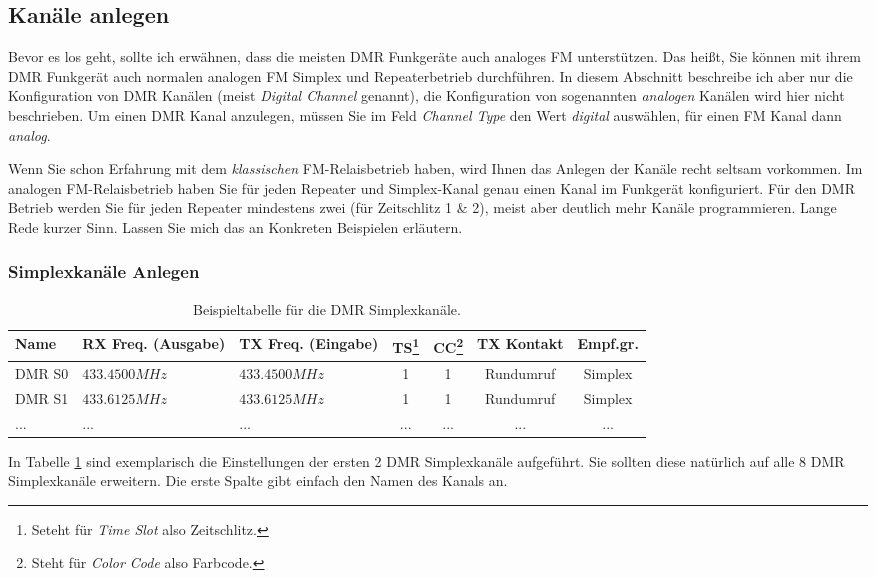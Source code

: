 \subsection{Kanäle anlegen} \label{sec:cp:channel}
Bevor es los geht, sollte ich erwähnen, dass die meisten DMR Funkgeräte auch analoges FM unterstützen. Das heißt, Sie können mit ihrem DMR Funkgerät auch normalen analogen FM Simplex und Repeaterbetrieb durchführen. In diesem Abschnitt beschreibe ich aber nur die Konfiguration von DMR Kanälen (meist \emph{Digital Channel} genannt), die Konfiguration von sogenannten \emph{analogen} Kanälen wird hier nicht beschrieben. Um einen DMR Kanal anzulegen, müssen Sie im Feld \emph{Channel Type} den Wert \emph{digital} auswählen, für einen FM Kanal dann \emph{analog}.

Wenn Sie schon Erfahrung mit dem \emph{klassischen} FM-Relaisbetrieb haben, wird Ihnen das Anlegen der Kanäle recht seltsam vorkommen. Im analogen FM-Relaisbetrieb haben Sie für jeden Repeater und Simplex-Kanal genau einen Kanal im Funkgerät konfiguriert. Für den DMR Betrieb werden Sie für jeden Repeater mindestens zwei (für Zeitschlitz 1 \& 2), meist aber deutlich mehr Kanäle programmieren. Lange Rede kurzer Sinn. Lassen Sie mich das an Konkreten Beispielen erläutern.

\subsubsection{Simplexkanäle Anlegen}
\begin{table}[!ht]
 \begin{tabular}{|l|p{2.5cm}|p{2.5cm}|c|c|c|c|} \hline
 Name       & RX Freq. (Ausgabe) & TX Freq. (Eingabe) & TS\footnote{Seteht für \emph{Time Slot} also Zeitschlitz.} & CC\footnote{Steht für \emph{Color Code} also Farbcode.} & TX Kontakt & Empf.gr. \\ \hline
 DMR S0     & $433.4500 MHz$     & $433.4500 MHz$     & 1           & 1        & Rundumruf  & Simplex \\
 DMR S1     & $433.6125 MHz$     & $433.6125 MHz$     & 1           & 1        & Rundumruf  & Simplex \\
 ...        & ...                & ...                & ...         & ...      & ...        & ... \\ \hline
 \end{tabular}
 \caption{Beispieltabelle für die DMR Simplexkanäle.} \label{tab:ch:simplex}
\end{table}

In Tabelle \ref{tab:ch:simplex} sind exemplarisch die Einstellungen der ersten 2 DMR Simplexkanäle aufgeführt. Sie sollten diese natürlich auf alle 8 DMR Simplexkanäle erweitern. Die erste Spalte gibt einfach den Namen des Kanals an. 

